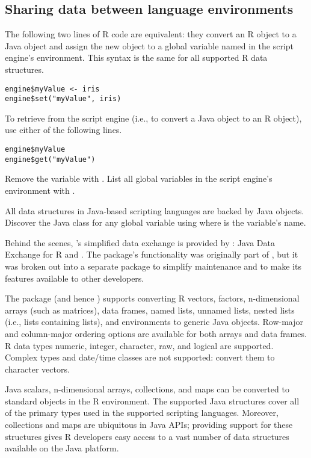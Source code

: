 \subsection{Sharing data between language environments}

The following two lines of R code are equivalent: they convert an R object to a Java object and assign the new object to a global variable named  in the script engine's environment. This syntax is the same for all supported R data structures.

\begin{verbatim}
engine$myValue <- iris
engine$set("myValue", iris)
\end{verbatim}

To retrieve  from the script engine (i.e., to convert a Java object to an R object), use either of the following lines.

\begin{verbatim}
engine$myValue
engine$get("myValue")
\end{verbatim}

Remove the  variable with . List all global variables in the script engine's environment with .

All data structures in Java-based scripting languages are backed by Java objects. Discover the Java class for any global variable using   where  is the variable's name.

Behind the scenes, 's simplified data exchange is provided by : Java Data Exchange for R and . The  package's functionality was originally part of , but it was broken out into a separate package to simplify maintenance and to make its features available to other developers.

The  package (and hence ) supports converting R vectors, factors, n-dimensional arrays (such as matrices), data frames, named lists, unnamed lists, nested lists (i.e., lists containing lists), and environments to generic Java objects. Row-major and column-major ordering options are available for both arrays and data frames. R data types numeric, integer, character, raw, and logical are supported. Complex types and date/time classes are not supported: convert them to character vectors.

Java scalars, n-dimensional arrays, collections, and maps can be converted to standard objects in the R environment. The supported Java structures cover all of the primary types used in the supported scripting languages. Moreover, collections and maps are ubiquitous in Java APIs; providing support for these structures gives R developers easy access to a vast number of data structures available on the Java platform.

